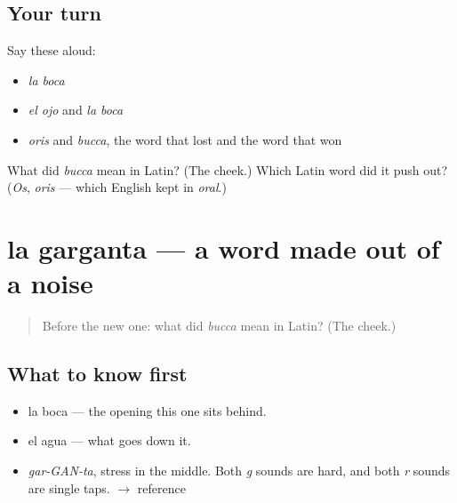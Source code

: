 \subsection*{Your turn}
Say these aloud:

\begin{itemize}
\raggedright
  \item \emph{la boca}
  \item \emph{el ojo} and \emph{la boca}
  \item \emph{oris} and \emph{bucca}, the word that lost and the word that won
\end{itemize}

\begin{tcolorbox}[breakable,colback=teal!4,colframe=teal!35!black,title={Before you move on}]
What did \emph{bucca} mean in Latin? (The cheek.) Which Latin word did it push out? (\emph{Os}, \emph{oris} — which English kept in \emph{oral}.)
\end{tcolorbox}
\section[la garganta]{la garganta — a word made out of a noise}

\label{lesson:ES-C286-garganta}



\begin{quote}
Before the new one: what did \emph{bucca} mean in Latin? (The cheek.)
\end{quote}

\subsection*{What to know first}
\begin{itemize}
\raggedright
  \item la boca — the opening this one sits behind.
  \item el agua — what goes down it.
\end{itemize}

\begin{sounds}
\begin{itemize}
\raggedright
  \item \emph{gar-GAN-ta}, stress in the middle. Both \emph{g} sounds are hard, and both \emph{r} sounds are single taps. $\to$ reference
\end{itemize}
\end{sounds}

